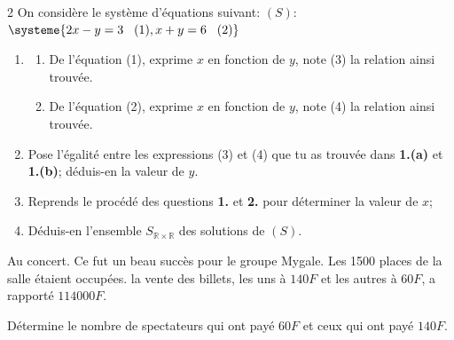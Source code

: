 \begin{multicols*}{2}
  	On considère le système d’équations suivant: $(S)$: $\systeme{2x-y=3 \hspace{0.3cm} (1), x+y=6 \hspace{0.3cm} (2)}$
  	\begin{enumerate}
  		\item 
  		\begin{enumerate}
  			\item De l'équation (1), exprime $x$ en fonction de $y$, note (3) la relation ainsi trouvée.
  			\item  De l'équation (2), exprime $x$ en fonction de $y$, note (4) la relation ainsi trouvée. 
  		\end{enumerate}
  		\item Pose l'égalité entre les expressions  (3) et (4)  que tu as trouvée dans \textbf{1.(a)} et \textbf{1.(b)}; déduis-en la valeur de $y$.
  		\item Reprends le procédé des questions  \textbf{1.} et \textbf{2.} pour déterminer la valeur de $x$;
  		\item  Déduis-en l'ensemble $S_{\mathbb{R}\times \mathbb{R}}$  des solutions de $(S)$.
  	\end{enumerate}
  	\dure
  	 
  	
  	
  	Au concert. Ce fut un beau succès pour le groupe Mygale. Les 1500 places de la salle étaient occupées. la vente des billets, les uns à $140 F$ et les autres à $60 F$, a rapporté $114 000 F$.
  	
  	Détermine le nombre de spectateurs qui ont payé $60F$ et ceux qui ont payé $140F$.
  	
  	\dures
\end{multicols*}
